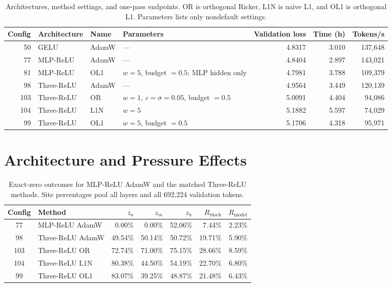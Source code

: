 \documentclass[10pt]{article}
\newcommand{\pct}{\%}
\newcommand{\tightsection}[1]{\section{#1}\vspace{-0.35em}}
\begin{document}
\begin{table}[H]
\centering
\caption{Architectures, method settings, and one-pass endpoints. OR is orthogonal Ricker, L1N is naive L1, and OL1 is orthogonal L1. Parameters lists only nondefault settings.}
\label{tab:endpoints}
\scriptsize
\begin{tabularx}{\textwidth}{rllXrrr}
\toprule
Config & Architecture & Name & Parameters & Validation loss & Time (h) & Tokens/s \\
\midrule
50 & GELU & AdamW & --- & 4.8317 & 3.010 & 137,648 \\
77 & MLP-ReLU & AdamW & --- & 4.8404 & 2.897 & 143,021 \\
81 & MLP-ReLU & OL1 & $w=5$, budget $=0.5$; MLP hidden only & 4.7981 & 3.788 & 109,379 \\
98 & Three-ReLU & AdamW & --- & 4.9564 & 3.449 & 120,139 \\
103 & Three-ReLU & OR & $w=1$, $c=\sigma=0.05$, budget $=0.5$ & 5.0091 & 4.404 & 94,086 \\
104 & Three-ReLU & L1N & $w=5$ & 5.1882 & 5.597 & 74,029 \\
99 & Three-ReLU & OL1 & $w=5$, budget $=0.5$ & 5.1706 & 4.318 & 95,971 \\
\bottomrule
\end{tabularx}
\end{table}

\tightsection{Architecture and Pressure Effects}

\begin{table}[H]
\centering
\caption{Exact-zero outcomes for MLP-ReLU AdamW and the matched Three-ReLU methods. Site percentages pool all layers and all 692,224 validation tokens.}
\label{tab:zeros}
\small
\begin{tabular}{clrrrrr}
\toprule
Config & Method & $z_a$ & $z_m$ & $z_h$ & $R_{\mathrm{block}}$ & $R_{\mathrm{model}}$ \\
\midrule
77 & MLP-ReLU AdamW & 0.00\pct{} & 0.00\pct{} & 52.06\pct{} & 7.44\pct{} & 2.23\pct{} \\
98 & Three-ReLU AdamW & 49.54\pct{} & 50.14\pct{} & 50.72\pct{} & 19.71\pct{} & 5.90\pct{} \\
103 & Three-ReLU OR & 72.74\pct{} & 71.00\pct{} & 75.15\pct{} & 28.66\pct{} & 8.59\pct{} \\
104 & Three-ReLU L1N & 80.38\pct{} & 44.50\pct{} & 54.19\pct{} & 22.70\pct{} & 6.80\pct{} \\
99 & Three-ReLU OL1 & 83.07\pct{} & 39.25\pct{} & 48.87\pct{} & 21.48\pct{} & 6.43\pct{} \\
\bottomrule
\end{tabular}
\end{table}
\end{document}
